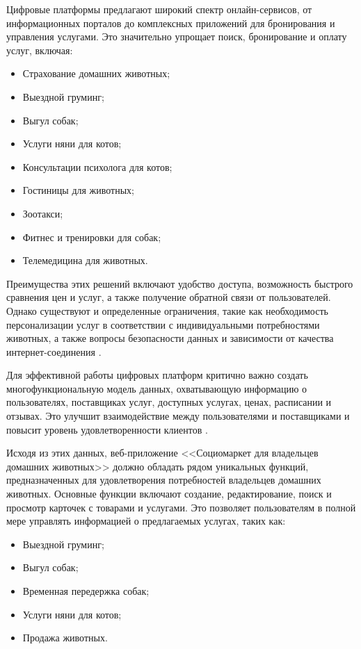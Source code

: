 Цифровые платформы предлагают широкий спектр онлайн-сервисов, от информационных порталов до комплексных приложений для бронирования и управления услугами. Это значительно упрощает поиск, бронирование и оплату услуг, включая:

\begin{itemize}
  \item Страхование домашних животных;
  \item Выездной груминг;
  \item Выгул собак;
  \item Услуги няни для котов;
  \item Консультации психолога для котов;
  \item Гостиницы для животных;
  \item Зоотакси;
  \item Фитнес и тренировки для собак;
  \item Телемедицина для животных.
\end{itemize}

Преимущества этих решений включают удобство доступа, возможность быстрого сравнения цен и услуг, а также получение обратной связи от пользователей. Однако существуют и определенные ограничения, такие как необходимость персонализации услуг в соответствии с индивидуальными потребностями животных, а также вопросы безопасности данных и зависимости от качества интернет-соединения \cite{market}.

Для эффективной работы цифровых платформ критично важно создать многофункциональную модель данных, охватывающую информацию о пользователях, поставщиках услуг, доступных услугах, ценах, расписании и отзывах. Это улучшит взаимодействие между пользователями и поставщиками и повысит уровень удовлетворенности клиентов \cite{freedman}.

Исходя из этих данных, веб-приложение <<Социомаркет для владельцев домашних животных>> должно обладать рядом уникальных функций, предназначенных для удовлетворения потребностей владельцев домашних животных. Основные функции включают создание, редактирование, поиск и просмотр карточек с товарами и услугами. Это позволяет пользователям в полной мере управлять информацией о предлагаемых услугах, таких как:

\begin{itemize}
  \item Выездной груминг;
  \item Выгул собак;
  \item Временная передержка собак;
  \item Услуги няни для котов;
  \item Продажа животных.
\end{itemize}

